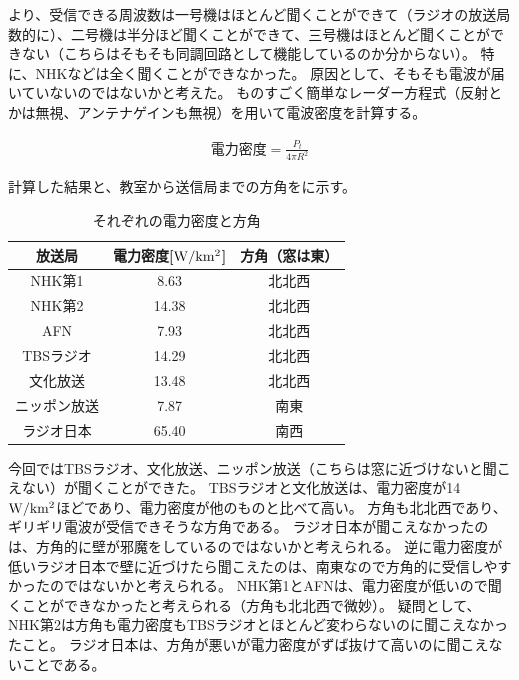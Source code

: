\documentclass[report.tex]{subfiles}
\begin{document}
より、受信できる周波数は一号機はほとんど聞くことができて（ラジオの放送局数的に）、二号機は半分ほど聞くことができて、三号機はほとんど聞くことができない（こちらはそもそも同調回路として機能しているのか分からない）。
特に、NHKなどは全く聞くことができなかった。
原因として、そもそも電波が届いていないのではないかと考えた。
ものすごく簡単なレーダー方程式（反射とかは無視、アンテナゲインも無視）を用いて電波密度を計算する。

\begin{align}
	電力密度 = \frac{P_t}{4 \pi R^2} \label{eq:radar}
\end{align}

計算した結果と、教室から送信局までの方角をに示す。

\begin{table}[H]
	\centering
	\caption{それぞれの電力密度と方角}
	\label{tab:aaa}
	\begin{tabular}{ccc} \hline
		放送局    & 電力密度[\(\rm{W/km^2}\)] & 方角（窓は東） \\ \hline
		NHK第1  & 8.63                  & 北北西     \\
		NHK第2  & 14.38                 & 北北西     \\
		AFN    & 7.93                  & 北北西     \\
		TBSラジオ & 14.29                 & 北北西     \\
		文化放送   & 13.48                 & 北北西     \\
		ニッポン放送 & 7.87                  & 南東      \\
		ラジオ日本  & 65.40                 & 南西      \\ \hline
	\end{tabular}
\end{table}

今回ではTBSラジオ、文化放送、ニッポン放送（こちらは窓に近づけないと聞こえない）が聞くことができた。
TBSラジオと文化放送は、電力密度が14 \(\rm{W/km^2}\)ほどであり、電力密度が他のものと比べて高い。
方角も北北西であり、ギリギリ電波が受信できそうな方角である。
ラジオ日本が聞こえなかったのは、方角的に壁が邪魔をしているのではないかと考えられる。
逆に電力密度が低いラジオ日本で壁に近づけたら聞こえたのは、南東なので方角的に受信しやすかったのではないかと考えられる。
NHK第1とAFNは、電力密度が低いので聞くことができなかったと考えられる（方角も北北西で微妙）。
疑問として、NHK第2は方角も電力密度もTBSラジオとほとんど変わらないのに聞こえなかったこと。
ラジオ日本は、方角が悪いが電力密度がずば抜けて高いのに聞こえないことである。
\end{document}
